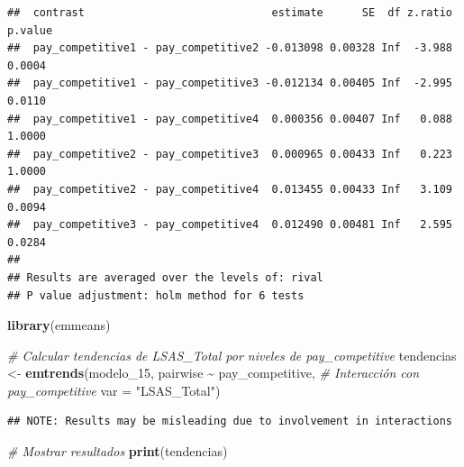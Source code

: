 \documentclass[
]{article}
\newenvironment{Shaded}{\begin{snugshade}}{\end{snugshade}}
\newcommand{\AttributeTok}[1]{\textcolor[rgb]{0.13,0.29,0.53}{#1}}
\newcommand{\CommentTok}[1]{\textcolor[rgb]{0.56,0.35,0.01}{\textit{#1}}}
\newcommand{\FunctionTok}[1]{\textcolor[rgb]{0.13,0.29,0.53}{\textbf{#1}}}
\newcommand{\NormalTok}[1]{#1}
\newcommand{\OtherTok}[1]{\textcolor[rgb]{0.56,0.35,0.01}{#1}}
\newcommand{\SpecialCharTok}[1]{\textcolor[rgb]{0.81,0.36,0.00}{\textbf{#1}}}
\newcommand{\StringTok}[1]{\textcolor[rgb]{0.31,0.60,0.02}{#1}}
\begin{document}
\begin{verbatim}
##  contrast                             estimate      SE  df z.ratio p.value
##  pay_competitive1 - pay_competitive2 -0.013098 0.00328 Inf  -3.988  0.0004
##  pay_competitive1 - pay_competitive3 -0.012134 0.00405 Inf  -2.995  0.0110
##  pay_competitive1 - pay_competitive4  0.000356 0.00407 Inf   0.088  1.0000
##  pay_competitive2 - pay_competitive3  0.000965 0.00433 Inf   0.223  1.0000
##  pay_competitive2 - pay_competitive4  0.013455 0.00433 Inf   3.109  0.0094
##  pay_competitive3 - pay_competitive4  0.012490 0.00481 Inf   2.595  0.0284
## 
## Results are averaged over the levels of: rival 
## P value adjustment: holm method for 6 tests
\end{verbatim}

\begin{Shaded}
\begin{Highlighting}[]
\FunctionTok{library}\NormalTok{(emmeans)}

\CommentTok{\# Calcular tendencias de LSAS\_Total por niveles de pay\_competitive}
\NormalTok{tendencias }\OtherTok{\textless{}{-}} \FunctionTok{emtrends}\NormalTok{(modelo\_15, }
\NormalTok{                       pairwise }\SpecialCharTok{\textasciitilde{}}\NormalTok{ pay\_competitive, }\CommentTok{\# Interacción con pay\_competitive}
                       \AttributeTok{var =} \StringTok{"LSAS\_Total"}\NormalTok{)}
\end{Highlighting}
\end{Shaded}

\begin{verbatim}
## NOTE: Results may be misleading due to involvement in interactions
\end{verbatim}

\begin{Shaded}
\begin{Highlighting}[]
\CommentTok{\# Mostrar resultados}
\FunctionTok{print}\NormalTok{(tendencias)}
\end{Highlighting}
\end{Shaded}
\end{document}
